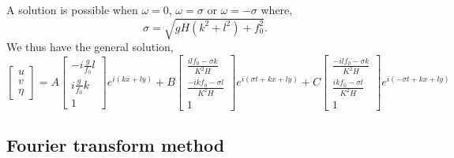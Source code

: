 \documentclass[11pt]{article}
\begin{document}
A solution is possible when $\omega=0$, $\omega=\sigma$ or $\omega=-\sigma$ where,
\begin{equation}
\sigma = \sqrt{ gH (k^2 + l^2) + f_0^2 }.
\end{equation}
We thus have the general solution,
\begin{equation}
\left[\begin{array}{c}u \\v \\ \eta\end{array}\right] =
A \left[\begin{array}{c} -i \frac{g}{f_0} l \\ i \frac{g}{f_0} k \\ 1 \end{array}\right] e^{i(kx + ly)} +
 B \left[\begin{array}{c} \frac{i l f_0 - \sigma k}{K^2 H} \\ \frac{-ikf_0-\sigma l}{K^2 H} \\ 1 \end{array}\right] e^{i( \sigma t + kx + ly)}
 +  C \left[\begin{array}{c} \frac{- i l f_0 - \sigma k}{K^2 H} \\ \frac{ikf_0-\sigma l}{K^2 H} \\ 1 \end{array}\right] e^{i( - \sigma t + kx + ly)}
\end{equation}

%
\subsection{Fourier transform method}
%
\end{document}
